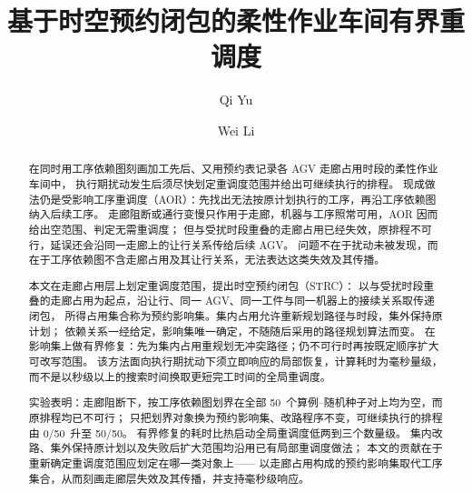 \documentclass[manuscript,screen,review]{acmart}
\providecommand{\STRC}{\textsc{STRC}}
\newcommand{\NPairs}{50}
\newcommand{\FeasRone}{0/\NPairs}            %
\newcommand{\FeasRtwo}{\NPairs/\NPairs}      %
\begin{document}
\title[基于时空预约闭包的有界重调度]{基于时空预约闭包的柔性作业车间有界重调度}

\author{Qi Yu}

\author{Wei Li}

\renewcommand{\shortauthors}{Yu and Li}

\begin{abstract}
在同时用工序依赖图刻画加工先后、又用预约表记录各 AGV 走廊占用时段的柔性作业车间中，
执行期扰动发生后须尽快划定重调度范围并给出可继续执行的排程。
现成做法仍是受影响工序重调度（AOR）：先找出无法按原计划执行的工序，再沿工序依赖图纳入后续工序。
走廊阻断或通行变慢只作用于走廊，机器与工序照常可用，AOR 因而给出空范围、判定无需重调度；
但与受扰时段重叠的走廊占用已经失效，原排程不可行，延误还会沿同一走廊上的让行关系传给后续 AGV。
问题不在于扰动未被发现，而在于工序依赖图不含走廊占用及其让行关系，无法表达这类失效及其传播。

本文在走廊占用层上划定重调度范围，提出时空预约闭包（\STRC）：
以与受扰时段重叠的走廊占用为起点，沿让行、同一 AGV、同一工件与同一机器上的接续关系取传递闭包，
所得占用集合称为预约影响集。集内占用允许重新规划路径与时段，集外保持原计划；
依赖关系一经给定，影响集唯一确定，不随随后采用的路径规划算法而变。
在影响集上做有界修复：先为集内占用重规划无冲突路径；仍不可行时再按既定顺序扩大可改写范围。
该方法面向执行期扰动下须立即响应的局部恢复，计算耗时为毫秒量级，
而不是以秒级以上的搜索时间换取更短完工时间的全局重调度。

实验表明：走廊阻断下，按工序依赖图划界在全部 \NPairs\ 个算例--随机种子对上均为空，而原排程均已不可行；
只把划界对象换为预约影响集、改路程序不变，可继续执行的排程由 \FeasRone\ 升至 \FeasRtwo。
有界修复的耗时比热启动全局重调度低两到三个数量级。
集内改路、集外保持原计划以及失败后扩大范围均沿用已有局部重调度做法；
本文的贡献在于重新确定重调度范围应划定在哪一类对象上——
以走廊占用构成的预约影响集取代工序集合，从而刻画走廊层失效及其传播，并支持毫秒级响应。
\end{abstract}
\end{document}
